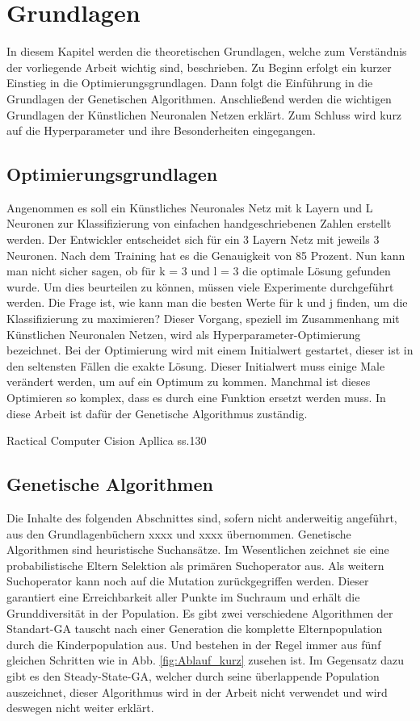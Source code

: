\section{Grundlagen}
\label{sec:Grundlagen}
In diesem Kapitel werden die theoretischen Grundlagen, welche zum Verständnis der vorliegende Arbeit wichtig sind, beschrieben. Zu Beginn erfolgt ein kurzer Einstieg in die Optimierungsgrundlagen. Dann folgt die Einführung in die Grundlagen der Genetischen Algorithmen. Anschließend werden die wichtigen Grundlagen der Künstlichen Neuronalen Netzen erklärt. Zum Schluss wird kurz auf die Hyperparameter und ihre Besonderheiten eingegangen.

\subsection{Optimierungsgrundlagen}
Angenommen es soll ein Künstliches Neuronales Netz mit k Layern und L Neuronen zur Klassifizierung von einfachen handgeschriebenen Zahlen erstellt werden. Der Entwickler entscheidet sich für ein 3 Layern Netz mit jeweils 3 Neuronen. Nach dem Training hat es die Genauigkeit von 85 Prozent. Nun kann man nicht sicher sagen, ob für k = 3 und l = 3  die optimale Lösung gefunden wurde. Um dies beurteilen zu können, müssen viele Experimente durchgeführt werden. Die Frage ist, wie kann man die besten Werte für k und j finden, um die Klassifizierung zu maximieren? Dieser Vorgang, speziell im Zusammenhang mit Künstlichen Neuronalen Netzen, wird als Hyperparameter-Optimierung bezeichnet. Bei der Optimierung wird mit einem Initialwert gestartet, dieser ist in den seltensten Fällen die exakte Lösung. Dieser Initialwert muss einige Male verändert werden, um auf ein Optimum zu kommen. Manchmal ist dieses Optimieren so komplex, dass es durch eine Funktion ersetzt werden muss. In diese Arbeit ist dafür der Genetische Algorithmus zuständig.

Ractical Computer Cision Apllica ss.130


\subsection{Genetische Algorithmen}

Die Inhalte des folgenden Abschnittes sind, sofern nicht anderweitig angeführt, aus den Grundlagenbüchern xxxx und xxxx übernommen. 
Genetische Algorithmen sind heuristische Suchansätze. Im Wesentlichen zeichnet sie eine probabilistische Eltern Selektion als primären Suchoperator aus. Als weitern Suchoperator kann noch auf die Mutation zurückgegriffen werden. Dieser garantiert eine Erreichbarkeit aller Punkte im Suchraum und erhält die Grunddiversität in der Population. Es gibt zwei verschiedene Algorithmen der Standart-GA tauscht nach einer Generation die komplette Elternpopulation durch die Kinderpopulation aus. Und bestehen in der Regel immer aus fünf gleichen Schritten wie in Abb. \ref{fig:Ablauf_kurz} zusehen ist. Im Gegensatz dazu gibt es den Steady-State-GA, welcher durch seine überlappende Population auszeichnet, dieser Algorithmus wird in der Arbeit nicht verwendet und wird deswegen nicht weiter erklärt.

